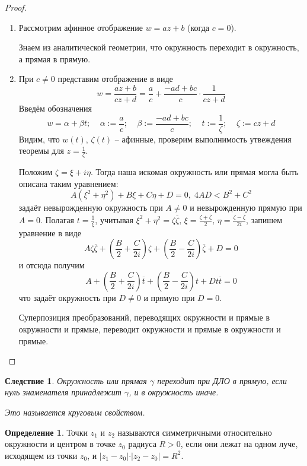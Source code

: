 \documentclass[a4paper,12pt]{article}
\theoremstyle{plain}
\newtheorem*{corollary}{Следствие}
\theoremstyle{definition}
\newtheorem{definition}{Определение}[section]
\theoremstyle{remark}
\begin{document}
\begin{proof}
	\begin{enumerate}
		\item Рассмотрим афинное отображение $w = az + b$ (когда $c = 0$).

		      Знаем из аналитической геометрии, что окружность переходит в окружность, а прямая в прямую.
		\item При $c \neq 0$ представим отображение в виде
		      \[
			      w = \frac{az + b}{cz + d} = \frac{a}{c} + \frac{-ad + bc}{c}\cdot\frac{1}{cz + d}
		      \]
		      Введём обозначения
		      \[
			      w = \alpha + \beta t;\;\;\;\; \alpha := \frac{a}{c};\;\;\;\; \beta := \frac{-ad + bc}{c};\;\;\;\; t := \frac{1}{\zeta} ;\;\;\;\; \zeta := cz + d
		      \]
		      Видим, что $w(t),\, \zeta(t)$ -- афинные, проверим выполнимость утвеждения теоремы для $z = \frac{1}{\zeta}$.

		      Положим $\zeta = \xi + i\eta$. Тогда наша искомая окружность или прямая могла быть описана таким уравнением:
		      \[
			      A(\xi^2 + \eta^2) + B\xi + C\eta + D = 0,\; 4AD < B^2 + C^2
		      \]
		      задаёт невырожденную окружность при $A \neq 0$ и невырожденную прямую при $A = 0$. Полагая $t = \frac{1}{\xi}$, учитывая $\xi^2 + \eta^2 = \zeta\overline{\zeta},\, \xi = \frac{\zeta + \overline{\zeta}}{2},\, \eta = \frac{\zeta - \overline{\zeta}}{2i}$, запишем уравнение в виде
		      \[
			      A\zeta\overline{\zeta} + \left(\frac{B}{2} + \frac{C}{2i}\right)\zeta + \left(\frac{B}{2} - \frac{C}{2i}\right)\overline{\zeta} + D = 0
		      \]
		      и отсюда получим
		      \[
			      A + \left(\frac{B}{2} + \frac{C}{2i}\right)\overline{t} + \left(\frac{B}{2} - \frac{C}{2i}\right)t + Dt\overline{t} = 0
		      \]
		      что задаёт окружность при $D \neq 0$ и прямую при $D = 0$.

		      Суперпозиция преобразований, переводящих окружности и прямые в окружности и прямые, переводит окружности и прямые в окружности и прямые.
	\end{enumerate}
\end{proof}

\begin{corollary}
	Окружность или прямая $\gamma$ переходит при ДЛО в прямую, если нуль знаменателя принадлежит $\gamma$, и в окружность иначе.

	Это называется круговым свойством.
\end{corollary}

\begin{definition}
	Точки $z_1$ и $z_2$ называются симметричными относительно окружности и центром в точке $z_0$ радиуса $R > 0$, если они лежат на одном луче, исходящем из точки $z_0$, и $\vert z_1 - z_0\vert\cdot\vert z_2 - z_0\vert = R^2$.
\end{definition}
\end{document}

